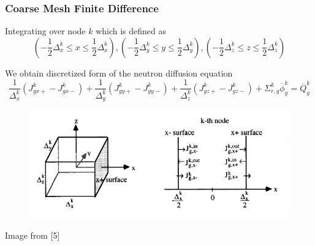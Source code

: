 \documentclass{beamer}
\begin{document}

\begin{frame}
\frametitle{Coarse Mesh Finite Difference}
\begin{block}{Integrating over node $k$ which is defined as}
    \begin{equation}
      { \scriptscriptstyle \left( { - \frac{1}{2}\Delta _x^k \le x \le \frac{1}{2}\Delta _x^k} \right),
      \left( { - \frac{1}{2}\Delta _y^k \le y \le \frac{1}{2}\Delta _y^k} \right),
      \left( { - \frac{1}{2}\Delta _z^k \le z \le \frac{1}{2}\Delta _z^k} \right)}
    \end{equation}
\end{block}
\begin{block}{We obtain discretized form of the neutron diffusion equation}
    \begin{equation}
      { \scriptscriptstyle \frac{1}{{\Delta _x^k}}\left( {J_{gx + }^k - J_{gx - }^k} \right) + \frac{1}{{\Delta _y^k}}\left( {J_{gy + }^k - J_{gy - }^k} \right) + \frac{1}{{\Delta _z^k}}\left( {J_{gz + }^k - J_{gz - }^k} \right) + \Sigma _{r,g}^k\overline \phi  _{g}^k = \overline Q _{g}^k} \label{eq:dif}
    \end{equation}
\end{block}
\begin{figure}
\includegraphics[width=0.6\linewidth]{int.png}
\end{figure}
\begin{flushleft}
  Image from [5]
\end {flushleft}
\end{frame}

\end{document}

